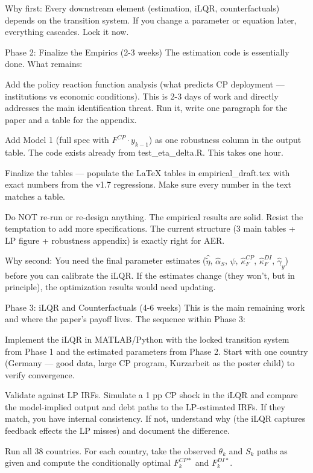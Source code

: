 \documentclass[12pt, a4paper]{article}
\begin{document}
Why first: Every downstream element (estimation, iLQR, counterfactuals) depends on the transition system. If you change a parameter or equation later, everything cascades. Lock it now.

Phase 2: Finalize the Empirics (2-3 weeks)
The estimation code is essentially done. What remains:

Add the policy reaction function analysis (what predicts CP deployment — institutions vs economic conditions). This is 2-3 days of work and directly addresses the main identification threat. Run it, write one paragraph for the paper and a table for the appendix.

Add Model 1 (full spec with $F^{CP} \cdot y_{k-1}$) as one robustness column in the output table. The code exists already from test_eta_delta.R. This takes one hour.

Finalize the tables — populate the LaTeX tables in empirical_draft.tex with exact numbers from the v1.7 regressions. Make sure every number in the text matches a table.

Do NOT re-run or re-design anything. The empirical results are solid. Resist the temptation to add more specifications. The current structure (3 main tables + LP figure + robustness appendix) is exactly right for AER.

Why second: You need the final parameter estimates ($\hat{\tilde{\eta}}$, $\hat{\alpha}_S$, $\hat{\psi}$, $\hat{\kappa}_F^{CP}$, $\hat{\kappa}_F^{DI}$, $\hat{\gamma}_y$) before you can calibrate the iLQR. If the estimates change (they won't, but in principle), the optimization results would need updating.

Phase 3: iLQR and Counterfactuals (4-6 weeks)
This is the main remaining work and where the paper's payoff lives. The sequence within Phase 3:

Implement the iLQR in MATLAB/Python with the locked transition system from Phase 1 and the estimated parameters from Phase 2. Start with one country (Germany — good data, large CP program, Kurzarbeit as the poster child) to verify convergence.

Validate against LP IRFs. Simulate a 1 pp CP shock in the iLQR and compare the model-implied output and debt paths to the LP-estimated IRFs. If they match, you have internal consistency. If not, understand why (the iLQR captures feedback effects the LP misses) and document the difference.

Run all 38 countries. For each country, take the observed $\theta_k$ and $S_k$ paths as given and compute the conditionally optimal $F_k^{CP*}$ and $F_k^{DI*}$.
\end{document}
